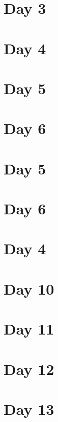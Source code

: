 \documentclass[]{book}
\begin{document}
\hypertarget{day-3}{%
\chapter{Day 3}\label{day-3}}

\hypertarget{day-4}{%
\chapter{Day 4}\label{day-4}}

\hypertarget{day-5}{%
\chapter{Day 5}\label{day-5}}

\hypertarget{day-6}{%
\chapter{Day 6}\label{day-6}}

\hypertarget{day-5-1}{%
\chapter{Day 5}\label{day-5-1}}

\hypertarget{day-6-1}{%
\chapter{Day 6}\label{day-6-1}}

\hypertarget{day-4-1}{%
\chapter{Day 4}\label{day-4-1}}

\hypertarget{day-10}{%
\chapter{Day 10}\label{day-10}}

\hypertarget{day-11}{%
\chapter{Day 11}\label{day-11}}

\hypertarget{day-12}{%
\chapter{Day 12}\label{day-12}}

\hypertarget{day-13}{%
\chapter{Day 13}\label{day-13}}
\end{document}

